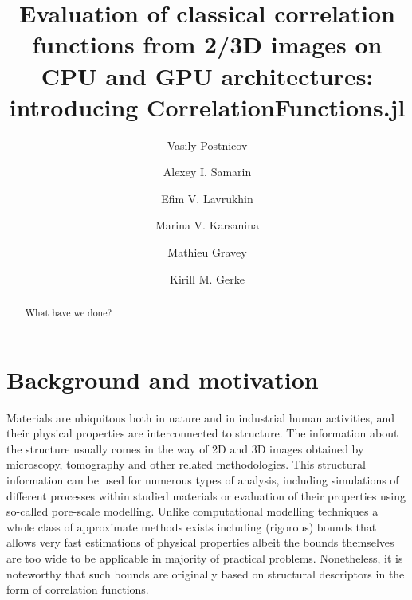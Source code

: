 \documentclass[reprint,amsmath,amssymb,aps,pre]{revtex4-1}
\begin{document}
\author{Vasily Postnicov}
\author{Alexey I. Samarin}
\author{Efim V. Lavrukhin}
\author{Marina V. Karsanina}
\author{Mathieu Gravey}
\author{Kirill M. Gerke}

\title{Evaluation of classical correlation functions from 2/3D images on CPU and
  GPU architectures: introducing CorrelationFunctions.jl}

\begin{abstract}
  What have we done?
\end{abstract}

\maketitle

\section{Background and motivation}
Materials are ubiquitous both in nature and in industrial human activities, and
their physical properties are interconnected to
structure\cite{Torq_book}\cite{Sahimi_book}\cite{Adler_book}. The information
about the structure usually comes in the way of 2D and 3D images obtained by
microscopy, tomography and other related methodologies. This structural
information can be used for numerous types of analysis, including simulations of
different processes within studied materials or evaluation of their properties
using so-called pore-scale modelling. Unlike computational modelling techniques
a whole class of approximate methods exists including (rigorous) bounds that
allows very fast estimations of physical properties albeit the bounds themselves
are too wide to be applicable in majority of practical problems. Nonetheless, it
is noteworthy that such bounds are originally based on structural descriptors in
the form of correlation functions.
\end{document}
